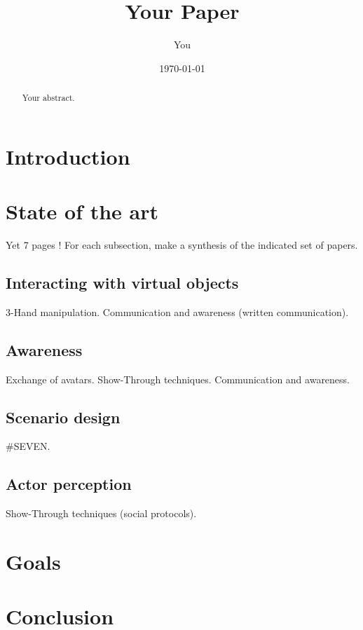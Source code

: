 \documentclass[a4paper]{article}
\title{Your Paper}
\author{You}
\date{\today}
\begin{document}
\maketitle

\begin{abstract}
Your abstract.
\end{abstract}

\section{Introduction}

\section{State of the art}
Yet 7 pages !
For each subsection, make a synthesis of the indicated set of papers.

\subsection{Interacting with virtual objects}
3-Hand manipulation.
Communication and awareness (written communication).

\subsection{Awareness}
Exchange of avatars.
Show-Through techniques.
Communication and awareness.

\subsection{Scenario design}
#SEVEN.

\subsection{Actor perception}
Show-Through techniques (social protocols).

\section{Goals}

\section{Conclusion}
\end{document}
